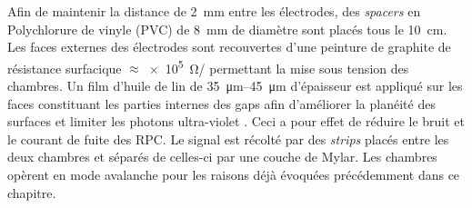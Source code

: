 Afin de maintenir la distance de \SI{2}{\milli\meter} entre les électrodes, des \textit{spacers} en Polychlorure de vinyle (PVC) de \SI{8}{\milli\meter} de diamètre sont placés tous le \SI{10}{\centi\meter}. Les faces externes des électrodes sont recouvertes d'une peinture de graphite de résistance surfacique $\approx$\SI{e5}{\ohm/\sq} permettant la mise sous tension des chambres. Un film d'huile de lin de \SIrange{35}{45}{\micro\meter} d'épaisseur est appliqué sur les faces constituant les parties internes des gaps afin d'améliorer la planéité des surfaces \cite{oil} et limiter les photons ultra-violet \cite{Lu:2009zzd}. Ceci a pour effet  de réduire le bruit et le courant de fuite des RPC.
Le signal est récolté par des \textit{strips} placés entre les deux chambres et séparés de celles-ci par une couche de Mylar. Les chambres opèrent en mode avalanche pour les raisons déjà évoquées précédemment dans ce chapitre.

